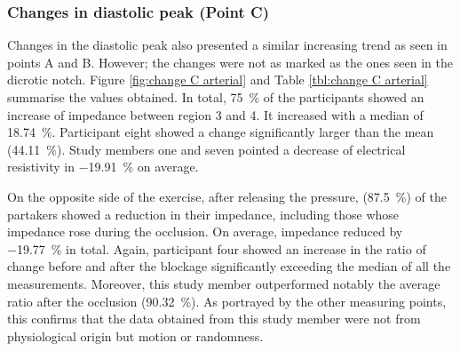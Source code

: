 \subsubsection{Changes in diastolic peak (Point C)}
\label{section apa 3.2.3}
Changes in the diastolic peak also presented a similar increasing trend as seen in points A and B. However; the changes were not as marked as the ones seen in the dicrotic notch. Figure \ref{fig:change C arterial} and Table \ref{tbl:change C arterial} summarise the values obtained. In total, \SI{75}{\percent} of the participants showed an increase of impedance between region 3 and 4. It increased with a median of \SI{18.74}{\percent}. Participant eight showed a change significantly larger than the mean (\SI{44.11}{\percent}). Study members one and seven pointed a decrease of electrical resistivity in \SI{-19.91}{\percent} on average.  

On the opposite side of the exercise, after releasing the pressure, (\SI{87.5}{\percent}) of the partakers showed a reduction in their impedance, including those whose impedance rose during the occlusion. On average, impedance reduced by \SI{-19.77}{\percent} in total. Again, participant four showed an increase in the ratio of change before and after the blockage significantly exceeding the median of all the measurements. Moreover, this study member outperformed notably the average ratio after the occlusion (\SI{90.32}{\percent}). As portrayed by the other measuring points, this confirms that the data obtained from this study member were not from physiological origin but motion or randomness. 

